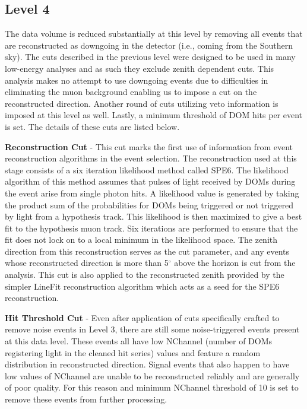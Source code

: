 \documentclass{gatech-thesis}
\begin{document}
\subsection{Level 4}
The data volume is reduced substantially at this level by removing all events that are reconstructed as downgoing  in the detector (i.e., coming from the Southern sky). The cuts described in the previous level were designed to be used in many low-energy analyses and as such they exclude zenith dependent cuts. This analysis makes no attempt to use downgoing events due to difficulties in eliminating the muon background enabling us to impose a cut on the reconstructed direction. Another round of cuts utilizing veto information is imposed at this level as well. Lastly, a minimum threshold of DOM hits per event is set. The details of these cuts are listed below.
\begin{adjustwidth}{2.5em}{2.5em}
\setlength{\parindent}{0pt}
\textbf{Reconstruction Cut} - This cut marks the first use of information from event reconstruction algorithms in the event selection. The reconstruction used at this stage consists of a six iteration likelihood method called SPE6. The likelihood algorithm of this method assumes that pulses of light received by DOMs during the event arise from single photon hits. A likelihood value is generated by taking the product sum of the probabilities for DOMs being triggered or not triggered by light from a hypothesis track. This likelihood is then maximized to give a best fit to the hypothesis muon track. Six iterations are performed to ensure that the fit does not lock on to a local minimum in the likelihood space. The zenith direction from this reconstruction serves as the cut parameter, and any events whose reconstructed direction is more than 5$^{\circ}$ above the horizon is cut from the analysis. This cut is also applied to the reconstructed zenith provided by the simpler LineFit reconstruction algorithm which acts as a seed for the SPE6 reconstruction.

\textbf{Hit Threshold Cut} - Even after application of cuts specifically crafted to remove noise events in Level 3, there are still some noise-triggered events present at this data level. These events all have low NChannel (number of DOMs registering light in the cleaned hit series) values and feature a random distribution in reconstructed direction. Signal events that also happen to have low values of NChannel are unable to be reconstructed reliably and are generally of poor quality. For this reason and minimum NChannel threshold of 10 is set to remove these events from further processing.


\end{adjustwidth}
\end{document}
